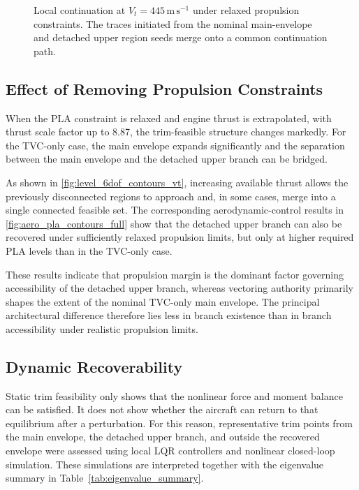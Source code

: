 \documentclass[conf]{new-aiaa}
\begin{document}
\begin{figure}[h]
\centering
{}
\caption{Local continuation at $V_t=445\,\mathrm{m\,s}^{-1}$ under relaxed propulsion constraints. The traces initiated from the nominal main-envelope and detached upper region seeds merge onto a common continuation path.}
\label{fig:branch_445_pla_alt}
\end{figure}

\subsection{Effect of Removing Propulsion Constraints}
When the PLA constraint is relaxed and engine thrust is extrapolated, with thrust scale factor up to 8.87, the trim-feasible structure changes markedly. For the TVC-only case, the main envelope expands significantly and the separation between the main envelope and the detached upper branch can be bridged.

As shown in \autoref{fig:level_6dof_contours_vt}, increasing available thrust allows the previously disconnected regions to approach and, in some cases, merge into a single connected feasible set. The corresponding aerodynamic-control results in \autoref{fig:aero_pla_contours_full} show that the detached upper branch can also be recovered under sufficiently relaxed propulsion limits, but only at higher required PLA levels than in the TVC-only case.

These results indicate that propulsion margin is the dominant factor governing accessibility of the detached upper branch, whereas vectoring authority primarily shapes the extent of the nominal TVC-only main envelope. The principal architectural difference therefore lies less in branch existence than in branch accessibility under realistic propulsion limits.

\subsection{Dynamic Recoverability}
Static trim feasibility only shows that the nonlinear force and moment balance can be satisfied. It does not show whether the aircraft can return to that equilibrium after a perturbation. For this reason, representative trim points from the main envelope, the detached upper branch, and outside the recovered envelope were assessed using local LQR controllers and nonlinear closed-loop simulation. These simulations are interpreted together with the eigenvalue summary in Table~\ref{tab:eigenvalue_summary}.
\end{document}
